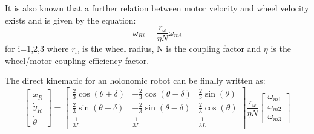 It is also known that a further relation between motor velocity and wheel velocity exists and is given by the equation:
\begin{equation}
\omega_{Ri}=\frac{r_\omega}{\eta N}\omega_{mi}
\end{equation}
for i=1,2,3 where $r_\omega$ is the wheel radius, N is the coupling factor and $\eta$ is the wheel/motor coupling efficiency factor.

The direct kinematic for an holonomic robot can be finally written as:
\begin{equation}
\begin{bmatrix}
\dot{x}_R\\
\dot{y}_R\\
\dot{\theta}
\end{bmatrix} =
\begin{bmatrix}
\frac{2}{3}\cos(\theta+\delta) & -\frac{2}{3}\cos(\theta-\delta) & \frac{2}{3}\sin(\theta)\\
\frac{2}{3}\sin(\theta+\delta) & -\frac{2}{3}\sin(\theta-\delta) & \frac{2}{3}\cos(\theta)\\
\frac{1}{3L} & \frac{1}{3L} & \frac{1}{3L}
\end{bmatrix}
\frac{r_\omega}{\eta N}
\begin{bmatrix}
\omega_{m1}\\
\omega_{m2}\\
\omega_{m3}
\end{bmatrix}
\label{directkin}
\end{equation}
